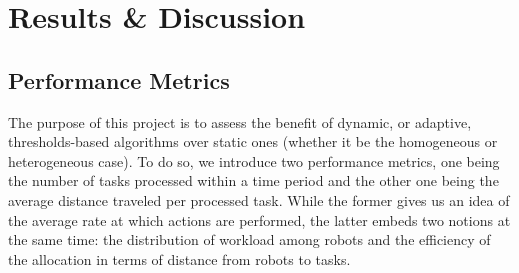 \section{Results \& Discussion}

\subsection{Performance Metrics}
The purpose of this project is to assess the benefit of dynamic, or adaptive, thresholds-based algorithms over static ones (whether it be the homogeneous or heterogeneous case). To do so, we introduce two performance metrics, one being the number of tasks processed within a time period and the other one being the average distance traveled per processed task. While the former gives us an idea of the average rate at which actions are performed, the latter embeds two notions at the same time: the distribution of workload among robots and the efficiency of the allocation in terms of distance from robots to tasks.

